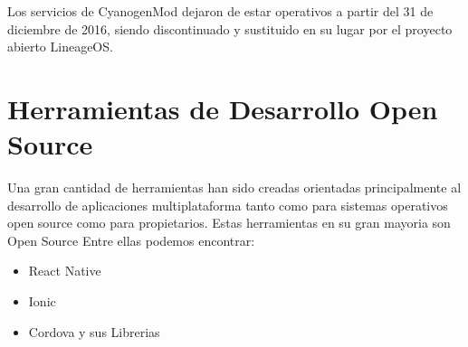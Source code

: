 Los servicios de CyanogenMod dejaron de estar operativos a partir del 31 de diciembre de 2016, siendo discontinuado y sustituido en su lugar por el proyecto abierto LineageOS.

\section{Herramientas de Desarrollo Open Source}
Una gran cantidad de herramientas han sido creadas orientadas principalmente al desarrollo de aplicaciones multiplataforma tanto como para sistemas operativos open source como para propietarios. Estas herramientas en su gran mayoria son Open Source 
Entre ellas podemos encontrar:
\begin{itemize}
	 \item React Native
 	 \item Ionic
 	 \item Cordova y sus Librerias
\end{itemize}
